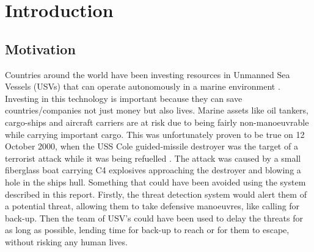 \documentclass[bsc,frontabs,twoside,singlespacing,parskip,deptreport]{infthesis}     %
\begin{document}
\maketitle


\tableofcontents



\chapter{Introduction}
\section{Motivation}
Countries around the world have been investing resources in Unmanned Sea Vessels (USVs) that can operate autonomously in a marine environment \cite{usvcase}.  Investing in this technology is important because they can save countries/companies not just money but also lives. Marine assets like oil tankers, cargo-ships and aircraft carriers are at risk due to being fairly non-manoeuvrable while carrying important cargo. This was unfortunately proven to be true on 12 October 2000, when the USS Cole guided-missile destroyer was the target of a terrorist attack while it was being refuelled \cite{combs2009encyclopedia}. The attack was caused by a small fiberglass boat carrying C4 explosives approaching the destroyer and blowing a hole in the ships hull. Something that could have been avoided using the system described in this report. Firstly, the threat detection system would alert them of a potential threat, allowing them to take defensive manoeuvres, like calling for back-up. Then  the team of USV's could have been used to delay the threats for as long as possible, lending time for back-up to reach or for them to escape, without risking any human lives.
\end{document}
